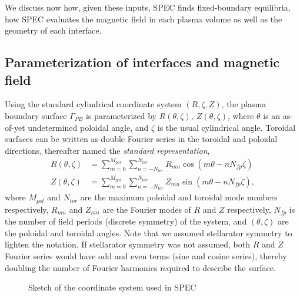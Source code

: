 \documentclass[my_thesis.tex]{subfiles}
\begin{document}
We discuss now how, given these inputs, SPEC finds fixed-boundary equilibria, how SPEC evaluates the magnetic field in each plasma volume as well as the geometry of each interface.

\subsection{Parameterization of interfaces and magnetic field}
Using the standard cylindrical coordinate system $(R,\zeta,Z)$, the plasma boundary surface $\Gamma_{PB}$ is parameterized by $R(\theta,\zeta),\ Z(\theta,\zeta)$, where $\theta$ is an as-of-yet undetermined poloidal angle, and $\zeta$ is the usual cylindrical angle. Toroidal surfaces can be written as double Fourier series in the toroidal and poloidal directions, thereafter named the \emph{standard representation},
\begin{align}
	{R}(\theta,\zeta) &= \sum_{m=0}^{M_{pol}}\sum_{n=-N_{tor}}^{N_{tor}} R_{mn}\cos(m\theta-nN_{fp}\zeta) \label{eq.toroidal surface 1}\\
	{Z}(\theta,\zeta) &= \sum_{m=0}^{M_{pol}}\sum_{n=-N_{tor}}^{N_{tor}} Z_{mn}\sin(m\theta-nN_{fp}\zeta) \label{eq.toroidal surface 2},
\end{align}
where $M_{pol}$ and $N_{tor}$ are the maximum poloidal and toroidal mode numbers respectively, $R_{mn}$ and $Z_{mn}$ are the Fourier modes of $R$ and $Z$ respectively, $N_{fp}$ is the number of field periods (discrete symmetry) of the system, and $(\theta,\zeta)$ are the poloidal and toroidal angles. Note that we assumed stellarator symmetry \citep{pfefferleEnergeticIonDynamics2015} to lighten the notation. If stellarator symmetry was not assumed, both $R$ and $Z$ Fourier series would have odd and even terms (sine and cosine series), thereby doubling the number of Fourier harmonics required to describe the surface.

\begin{figure}
	\centering
	\caption{Sketch of the coordinate system used in SPEC}
	\label{fig.spec coordinates}
\end{figure}
\end{document}
